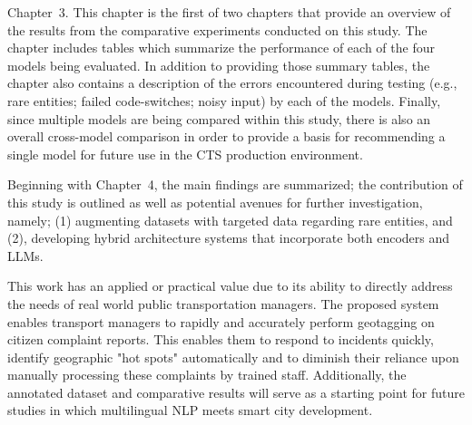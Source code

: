 Chapter~3. This chapter is the first of two chapters that provide an overview of the results from the comparative experiments conducted on this study. The chapter includes tables which summarize the performance of each of the four models being evaluated. In addition to providing those summary tables, the chapter also contains a description of the errors encountered during testing (e.g., rare entities; failed code-switches; noisy input) by each of the models. Finally, since multiple models are being compared within this study, there is also an overall cross-model comparison in order to provide a basis for recommending a single model for future use in the CTS production environment.

Beginning with Chapter~4, the main findings are summarized; the contribution of this study is outlined as well as potential avenues for further investigation, namely; (1) augmenting datasets with targeted data regarding rare entities, and (2), developing hybrid architecture systems that incorporate both encoders and LLMs.

This work has an applied or practical value due to its ability to directly address the needs of real world public transportation managers. The proposed system enables transport managers to rapidly and accurately perform geotagging on citizen complaint reports. This enables them to respond to incidents quickly, identify geographic "hot spots" automatically and to diminish their reliance upon manually processing these complaints by trained staff. Additionally, the annotated dataset and comparative results will serve as a starting point for future studies in which multilingual NLP meets smart city development.